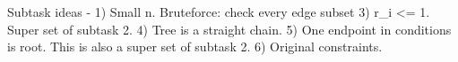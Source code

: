 Subtask ideas -
1) Small n. Bruteforce: check every edge subset
3) r_i <= 1. Super set of subtask 2.
4) Tree is a straight chain. 
5) One endpoint in conditions is root. This is also a super set of subtask 2.
6) Original constraints.
